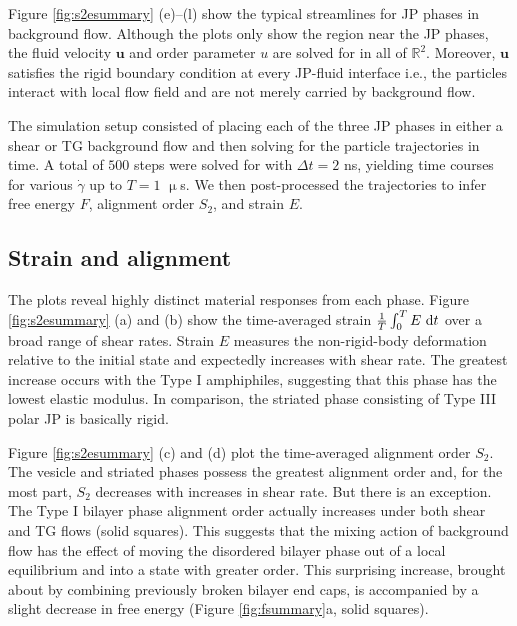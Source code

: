 \documentclass[prb,preprint,showpacs,preprintnumbers,amsmath,amssymb,longbibliography]{revtex4-1}
\newcommand{\uu}{\mathbf{u}}
\begin{document}
Figure \ref{fig:s2esummary} (e)--(l) show the typical streamlines
for JP phases in background flow.  Although the plots only show
the region near the JP phases, the fluid velocity $\uu$ and 
order parameter $u$ are solved for in all of $\mathbb{R}^2$.
Moreover, $\uu$ satisfies the rigid boundary condition at 
every JP-fluid interface i.e., the particles interact with local
flow field and are not merely carried by background flow.

The simulation setup consisted of placing each of the three JP phases
in either a shear or TG background flow and then solving for the 
particle trajectories in time.  A total of $500$ steps were solved
for with $\Delta t = 2$ ns, yielding time courses for various 
$\dot \gamma$ up to $T = 1$ $\upmu$s.  We then post-processed the trajectories
to infer free energy $F$, alignment order $S_2$, and strain $E$.     



\subsection{Strain and alignment}
The plots reveal highly distinct material responses from each phase.
Figure \ref{fig:s2esummary} (a) and (b) show the time-averaged
strain $\frac{1}{T}\int_0^T E \,\dif t$ over a broad
range of shear rates.  Strain $E$
measures the non-rigid-body deformation relative to the initial state
and expectedly increases with shear rate.
The greatest increase occurs with the Type I amphiphiles, 
suggesting that this phase has the lowest elastic modulus. In comparison, 
the  striated phase consisting of  Type III polar JP is
basically rigid.  

Figure \ref{fig:s2esummary} (c) and (d) plot the time-averaged
alignment order $S_2$. The vesicle and striated phases possess
the greatest alignment order and, 
for the most part, $S_2$ decreases with increases in shear rate.
But there is an exception.  The Type I bilayer phase alignment
order actually increases under both shear and TG flows (solid squares).  
This suggests that 
the mixing action of background flow has the effect of moving the
disordered bilayer phase out of a local equilibrium and into a state
with greater order.
This surprising increase, 
brought about by combining previously broken bilayer 
end caps, is accompanied
by a slight decrease in free energy (Figure \ref{fig:fsummary}a, solid squares).
\end{document}
